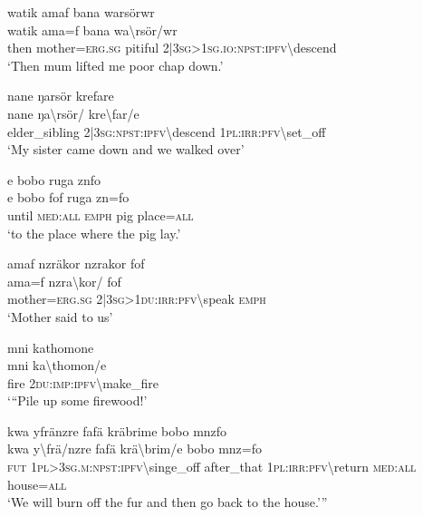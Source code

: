\ea\label{ex:14:a2997}
watik amaf bana warsörwr\\
\gll watik	ama=f	bana	wa{\textbackslash}rsör/wr\\
     then	mother=\textsc{erg}.\textsc{sg}	pitiful	2|3\textsc{sg}>1\textsc{sg}.\textsc{io}:\textsc{npst}:\textsc{ipfv}{\textbackslash}descend\\
\glt `Then mum lifted me poor chap down.'
\z

\ea\label{ex:14:a2999}
nane ŋarsör krefare\\
\gll nane	ŋa{\textbackslash}rsör/	kre{\textbackslash}far/e\\
     elder\_sibling	2|3\textsc{sg}:\textsc{npst}:\textsc{ipfv}{\textbackslash}descend	1\textsc{pl}:\textsc{irr}:\textsc{pfv}{\textbackslash}set\_off\\
\glt `My sister came down and we walked over'
\z

\ea\label{ex:14:a3001}
e bobo ruga znfo\\
\gll e	bobo	fof	ruga	zn=fo\\
     until	\textsc{med}:\textsc{all}	\textsc{emph}	pig	place=\textsc{all}\\
\glt `to the place where the pig lay.'
\z

\ea\label{ex:14:a3002}
amaf nzräkor nzrakor fof\\
\gll ama=f	nzra{\textbackslash}kor/	fof\\
     mother=\textsc{erg}.\textsc{sg}	2|3\textsc{sg}>1\textsc{du}:\textsc{irr}:\textsc{pfv}{\textbackslash}speak	\textsc{emph}\\
\glt `Mother said to us'
\z

\ea\label{ex:14:a3003}
mni kathomone\\
\gll mni	ka{\textbackslash}thomon/e\\
     fire	2\textsc{du}:\textsc{imp}:\textsc{ipfv}{\textbackslash}make\_fire\\
\glt `{``}Pile up some firewood!'
\z

\ea\label{ex:14:a3004}
kwa yfränzre fafä kräbrime bobo mnzfo\\
\gll kwa	y{\textbackslash}frä/nzre	fafä	krä{\textbackslash}brim/e	bobo	mnz=fo\\
     \textsc{fut}	1\textsc{pl}>3\textsc{sg}.\textsc{m}:\textsc{npst}:\textsc{ipfv}{\textbackslash}singe\_off	after\_that	1\textsc{pl}:\textsc{irr}:\textsc{pfv}{\textbackslash}return	\textsc{med}:\textsc{all}	house=\textsc{all}\\
\glt `We will burn off the fur and then go back to the house.'''
\z


